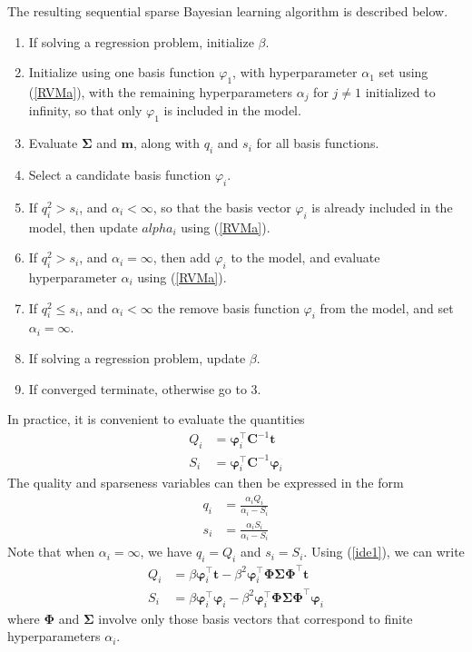 \documentclass[a4paper]{book}
\renewcommand{\bf}{\mathbf}
\newcommand{\bs}{\boldsymbol}
\begin{document}
The resulting sequential sparse Bayesian learning algorithm is described below.
\begin{enumerate}
	\item If solving a regression problem, initialize $\beta$.
	\item Initialize using one basis function $\varphi_1$, with hyperparameter $\alpha_1$ set using (\ref{RVMa}), with the remaining hyperparameters $\alpha_j$ for $j \neq 1$ initialized to infinity, so that only $\varphi_1$ is included in the model.
	\item Evaluate $\bs{\Sigma}$ and $\bf{m}$, along with $q_i$ and $s_i$ for all basis functions.
	\item Select a candidate basis function $\varphi_i$.
	\item If $q_i^2 > s_i$, and $\alpha_i < \infty$, so that the basis vector $\varphi_i$ is already included in the model, then update $alpha_i$ using (\ref{RVMa}).
	\item If $q_i^2 > s_i$, and $\alpha_i = \infty$, then add $\varphi_i$ to the model, and evaluate hyperparameter $\alpha_i$ using (\ref{RVMa}).
	\item If $q_i^2 \leq s_i$, and $\alpha_i < \infty$ the remove basis function $\varphi_i$ from the model, and set $\alpha_i = \infty$.
	\item If solving a regression problem, update $\beta$.
	\item If converged terminate, otherwise go to 3. 
\end{enumerate}

In practice, it is convenient to evaluate the quantities
\begin{align}
	Q_i &= \bs{\varphi}_i^{\intercal}\bf{C}^{-1}\bf{t}\\
	S_i &= \bs{\varphi}_i^{\intercal} \bf{C}^{-1}\bs{\varphi}_i
\end{align}
The quality and sparseness variables can then be expressed in the form
\begin{align}
	q_i &= \frac{\alpha_i Q_i}{\alpha_i -S_i}\\
	s_i &= \frac{\alpha_i S_i}{\alpha_i-S_i}
\end{align}
Note that when $\alpha_i = \infty$, we have $q_i = Q_i$ and $s_i = S_i$. Using (\ref{ide1}), we can write
\begin{align}
	Q_i &= \beta \bs{\varphi}_i^{\intercal} \bf{t}-\beta^2 \bs{\varphi}_i^{\intercal} \bs{\Phi} \bs{\Sigma} \bs{\Phi}^{\intercal} \bf{t}\\
	S_i &= \beta \bs{\varphi}_i^{\intercal} \bs{\varphi}_i - \beta^2 \bs{\varphi}_i^{\intercal} \bs{\Phi} \bs{\Sigma}\bs{\Phi}^{\intercal} \bs{\varphi}_i
\end{align}
where $\bs{\Phi}$ and $\bs{\Sigma}$ involve only those basis vectors that correspond to finite hyperparameters $\alpha_i$.
\end{document}
